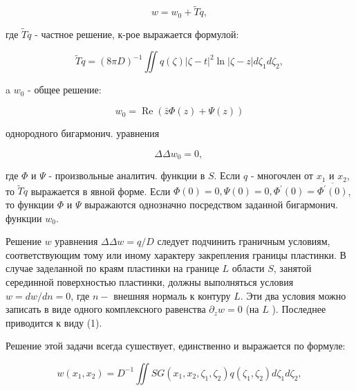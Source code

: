 \documentclass[10pt]{article}
\begin{document}
\[

w=w_{0}+\tilde{T} q,

\]



где $\tilde{T} q$ - частное решение, к-рое выражается формулой:



\[

\tilde{T} q=(8 \pi D)^{-1} \iint q(\zeta)|\zeta-t|^{2} \ln |\zeta-z| d \zeta_{1} d \zeta_{2},

\]



a $w_{0}$ - общее решение:



\[

w_{0}=\operatorname{Re}(\bar{z} \Phi(z)+\Psi(z))

\]



однородного бигармонич. уравнения



\[

\Delta \Delta w_{0}=0 \text {, }

\]



где $\Phi$ и $\Psi$ - произвольные аналитич. функции в $S$. Если $q$ - многочлен от $x_{1}$ и $x_{2}$, то $\tilde{T} q$ выражается в явной форме. Если $\Phi(0)=0, \Psi(0)=0, \Phi^{\prime}(0)=\overline{\Phi^{\prime}(0)}$, то функции $\Phi$ и $\Psi$ выражаются однозначно посредством заданной бигармонич. функции $w_{0}$.



Решение $w$ уравнения $\Delta \Delta w=q / D$ следует подчинить граничным условиям, соответствующим тому или иному характеру закрепления границы пластинки. В случае заделанной по краям пластинки на границе $L$ области $S$, занятой серединной поверхностью пластинки, должны выполняться условия $w=d w / d n=0$, где $n-$ внешняя нормаль к контуру $L$. Эти два условия можно записать в виде одного комплексного равенства $\partial_{z} w=0$ (на $L$ ). Последнее приводится к виду (1).



Решение этой задачи всегда сушествует, единственно и выражается по формуле:



\[

w\left(x_{1}, x_{2}\right)=D^{-1} \iint S G\left(x_{1}, x_{2}, \zeta_{1}, \zeta_{2}\right) q\left(\zeta_{1}, \zeta_{2}\right) d \zeta_{1} d \zeta_{2},

\]
\end{document}
